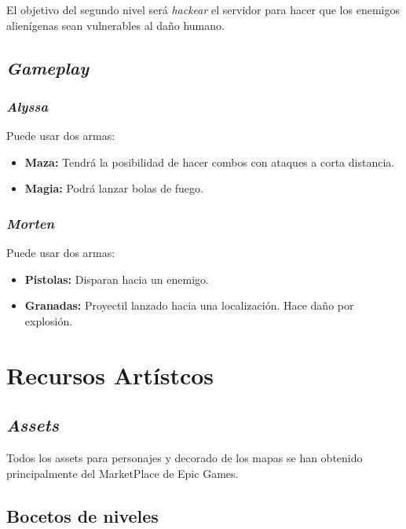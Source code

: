 \documentclass[11pt, twoside]{article}
\begin{document}
El objetivo del segundo nivel será \textit{hackear} el servidor para hacer que los enemigos alienígenas sean vulnerables al daño humano. 

\subsection{\textit{Gameplay}}

\subsubsection{\textit{Alyssa}}
Puede usar dos armas:
\begin{itemize}
	\item \textbf{Maza:} Tendrá la posibilidad de hacer combos con ataques a corta distancia.
	\item \textbf{Magia:} Podrá lanzar bolas de fuego.
\end{itemize}

\subsubsection{\textit{Morten}}
Puede usar dos armas:
\begin{itemize}
	\item \textbf{Pistolas:} Disparan hacia un enemigo.
	\item \textbf{Granadas:} Proyectil lanzado hacia una localización. Hace daño por explosión. 
\end{itemize}

\newpage
\pagestyle{insection}
\section{Recursos Artístcos}

\subsection{\textit{Assets}}
Todos los assets para personajes y decorado de los mapas se han obtenido principalmente del MarketPlace de Epic Games.

\subsection{Bocetos de niveles}
\end{document}

